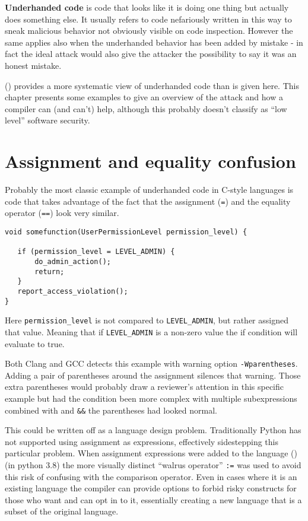 \documentclass[
  a4paper,
]{report}
\begin{document}
\textbf{Underhanded code} is code that looks like it is doing one thing
but actually does something else. It usually refers to code nefariously
written in this way to sneak malicious behavior not obviously visible on
code inspection. However the same applies also when the underhanded
behavior has been added by mistake - in fact the ideal attack would also
give the attacker the possibility to say it was an honest mistake.

() provides a more systematic
view of underhanded code than is given here. This chapter presents some
examples to give an overview of the attack and how a compiler can (and
can't) help, although this probably doesn't classify as ``low level''
software security.

\section{Assignment and equality
confusion}\label{assignment-and-equality-confusion}

Probably the most classic example of underhanded code in C-style
languages is code that takes advantage of the fact that the assignment
(\texttt{=}) and the equality operator (\texttt{==}) look very similar.

\begin{verbatim}
void somefunction(UserPermissionLevel permission_level) {

   if (permission_level = LEVEL_ADMIN) {
       do_admin_action();
       return;
   }
   report_access_violation();
}
\end{verbatim}

Here \texttt{permission\_level} is not compared to
\texttt{LEVEL\_ADMIN}, but rather assigned that value. Meaning that if
\texttt{LEVEL\_ADMIN} is a non-zero value the if condition will evaluate
to true.

Both Clang and GCC detects this example with warning option
\texttt{-Wparentheses}. Adding a pair of parentheses around the
assignment silences that warning. Those extra parentheses would probably
draw a reviewer's attention in this specific example but had the
condition been more complex with multiple subexpressions combined with
\texttt{\textbar{}\textbar{}} and \texttt{\&\&} the parentheses had
looked normal.

This could be written off as a language design problem. Traditionally
Python has not supported using assignment as expressions, effectively
sidestepping this particular problem. When assignment expressions were
added to the language () (in python 3.8) the more visually distinct ``walrus
operator'' \texttt{:=} was used to avoid this risk of confusing with the
comparison operator. Even in cases where it is an existing language the
compiler can provide options to forbid risky constructs for those who
want and can opt in to it, essentially creating a new language that is a
subset of the original language.
\end{document}
